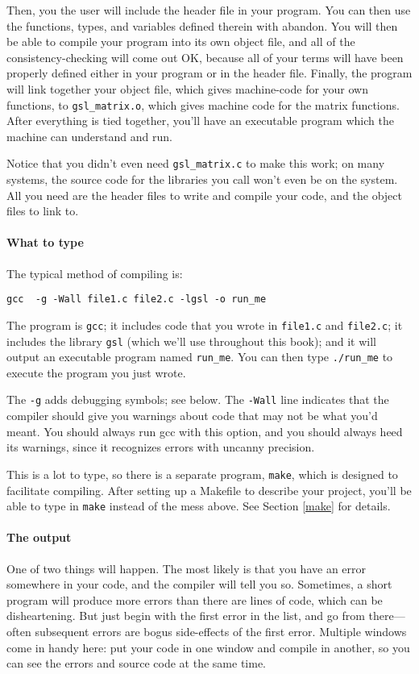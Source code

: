 \documentclass[12pt]{article}
\def\ind#1{\index{#1}#1}
\begin{document}
Then, you the user will include the header file in your program. You can then
use the functions, types, and variables defined therein with abandon.
You will then be able to compile your program into its own object file,
and all of the consistency-checking will come out OK, because all of your
terms will have been properly defined either in your program or in the
header file. Finally, the program will link together your object file,
which gives machine-code for your own functions, to {\tt gsl\_matrix.o},
which gives machine code for the matrix functions. After everything is
tied together, you'll have an executable program which the machine can
understand and run.

Notice that you didn't even need {\tt gsl\_matrix.c} to make this work;
on many systems, the source code for the libraries you call
won't even be on the system. All you need are the 
header files to write and compile your code, and the
object files to link to.



\paragraph{What to type}
The typical method of compiling is:

\begin{verbatim}
gcc  -g -Wall file1.c file2.c -lgsl -o run_me
\end{verbatim}

The program is {\tt gcc}; it includes code that you wrote in {\tt file1.c} and {\tt file2.c}; it
includes the library {\tt gsl} (which we'll use throughout this book); and it will output an executable
program named {\tt run\_me}. You can then type {\tt ./run\_me} to execute the program you just wrote. 

The {\tt -g} adds \ind{debugging} symbols; see below.  The {\tt -Wall} line
indicates that the compiler should give you warnings about code that
may not be what you'd meant. You should always run gcc with this option,
and you should always heed its warnings, since it recognizes errors with
uncanny precision.

This is a lot to type, so there is a separate program, {\tt make},
which is designed to facilitate compiling. After setting up a Makefile
to describe your project, you'll be able to type in {\tt make} instead
of the mess above. See Section \ref{make} for details.

\paragraph{The output} One of two things will happen. The most likely is that you have an error somewhere
in your code, and the compiler will tell you so. Sometimes, a short program will produce more errors than
there are lines of code, which can be disheartening. But just begin with the first error in the list, and
go from there---often subsequent errors are bogus side-effects of the first error. Multiple windows come in handy here:
put your code in one window and compile in another, so you can see the errors and source code at the same time.
\end{document}

